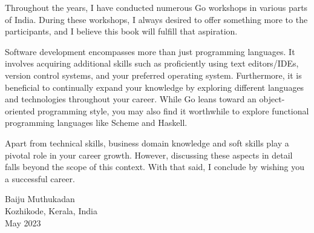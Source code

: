 Throughout the years, I have conducted numerous Go workshops in various parts of
India. During these workshops, I always desired to offer something more to the
participants, and I believe this book will fulfill that aspiration.

Software development encompasses more than just programming languages. It
involves acquiring additional skills such as proficiently using text
editors/IDEs, version control systems, and your preferred operating system.
Furthermore, it is beneficial to continually expand your knowledge by exploring
different languages and technologies throughout your career. While Go leans
toward an object-oriented programming style, you may also find it worthwhile to
explore functional programming languages like Scheme and Haskell.

Apart from technical skills, business domain knowledge and soft skills play a
pivotal role in your career growth. However, discussing these aspects in detail
falls beyond the scope of this context. With that said, I conclude by wishing
you a successful career.

\thispagestyle{plain}

\vspace*{.2in}
Baiju Muthukadan\\
Kozhikode, Kerala, India\\
May 2023
